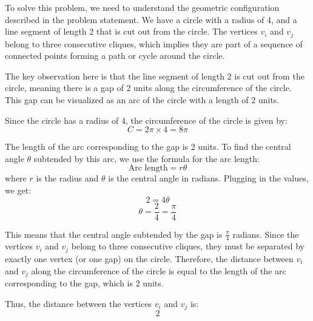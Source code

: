 To solve this problem, we need to understand the geometric configuration described in the problem statement. We have a circle with a radius of 4, and a line segment of length 2 that is cut out from the circle. The vertices \(v_i\) and \(v_j\) belong to three consecutive cliques, which implies they are part of a sequence of connected points forming a path or cycle around the circle.

The key observation here is that the line segment of length 2 is cut out from the circle, meaning there is a gap of 2 units along the circumference of the circle. This gap can be visualized as an arc of the circle with a length of 2 units.

Since the circle has a radius of 4, the circumference of the circle is given by:
\[ C = 2\pi \times 4 = 8\pi \]

The length of the arc corresponding to the gap is 2 units. To find the central angle \(\theta\) subtended by this arc, we use the formula for the arc length:
\[ \text{Arc length} = r \theta \]
where \(r\) is the radius and \(\theta\) is the central angle in radians. Plugging in the values, we get:
\[ 2 = 4 \theta \]
\[ \theta = \frac{2}{4} = \frac{\pi}{4} \]

This means that the central angle subtended by the gap is \(\frac{\pi}{4}\) radians. Since the vertices \(v_i\) and \(v_j\) belong to three consecutive cliques, they must be separated by exactly one vertex (or one gap) on the circle. Therefore, the distance between \(v_i\) and \(v_j\) along the circumference of the circle is equal to the length of the arc corresponding to the gap, which is 2 units.

Thus, the distance between the vertices \(v_i\) and \(v_j\) is:
\[ \boxed{2} \]
